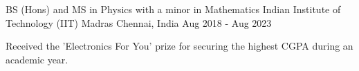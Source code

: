 

\begin{cventries}

  \cventry
    {BS (Hons) and MS in Physics with a minor in Mathematics } %
    {Indian Institute of Technology (IIT) Madras} %
    {Chennai, India} %
    {Aug 2018 - Aug 2023} %
    {
      \begin{cvitems} %
        \item {Received the 'Electronics For You' prize for securing the highest CGPA during an academic year.}
      \end{cvitems}
    }

\end{cventries}
